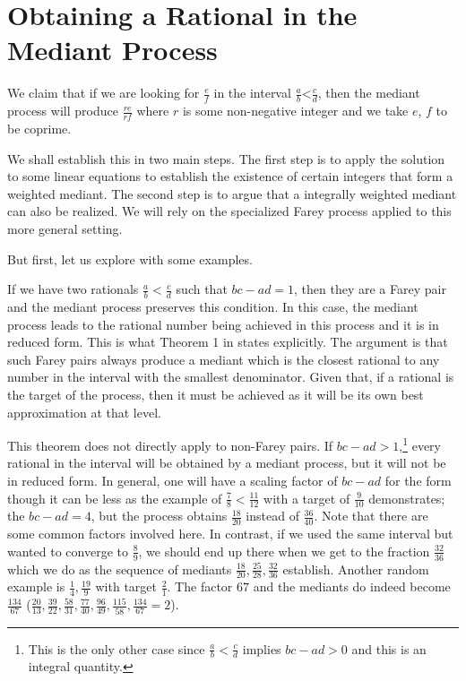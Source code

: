 \documentclass[12pt]{article}
\theoremstyle{remark}
\newcommand{\lt}{\mathord{<}}
\begin{document}
\section{Obtaining a Rational in the Mediant Process}\label{app:med}

We claim that if we are looking for $\frac{e}{f}$ in the interval $\frac{a}{b} \lt \frac{c}{d}$, then the mediant process will produce $\frac{re}{rf}$ where $r$ is some non-negative integer and we take $e$, $f$ to be coprime. 

We shall establish this in two main steps. The first step is to apply the solution to some linear equations to establish the existence of certain integers that form a weighted mediant. The second step is to argue that a integrally weighted mediant can also be realized.  We will rely on the specialized Farey process applied to this more general setting. 

But first, let us explore with some examples. 

If we have two rationals $\frac{a}{b} < \frac{c}{d}$ such that $bc - ad = 1$, then they are a Farey pair and the mediant process preserves this condition. In this case, the mediant process leads to the rational number being achieved in this process and it is in reduced form. This is what Theorem 1 in \cite{richards} states explicitly. The argument is that such Farey pairs always produce a mediant which is the closest rational to any number in the interval with the smallest denominator. Given that, if a rational is the target of the process, then it must be achieved as it will be its own best approximation at that level. 

This theorem does not directly apply to non-Farey pairs. If $bc-ad > 1$,\footnote{This is the only other case since $\frac{a}{b} < \frac{c}{d}$ implies $bc - ad > 0$ and this is an integral quantity.} every rational in the interval will be obtained by a mediant process, but it will not be in reduced form. In general, one will have a scaling factor of $bc-ad$ for the form though it can be less as the example of $\frac{7}{8}< \frac{11}{12}$ with a target of $\frac{9}{10}$ demonstrates; the $bc-ad = 4$, but the process obtains $\frac{18}{20}$ instead of $\frac{36}{40}$. Note that there are some common factors involved here. In contrast, if we used the same interval but wanted to converge to $\frac{8}{9}$, we should end up there when we get to the fraction $\frac{32}{36}$ which we do as the sequence of mediants $\frac{18}{20}, \frac{25}{28}, \frac{32}{36}$ establish. Another random example is  $\frac{1}{4} , \frac{19}{9}$ with target $\frac{2}{1}$. The factor $67$ and the mediants do indeed become $\frac{134}{67}$  ($\frac{20}{13}, \frac{39}{22}, \frac{58}{31}, \frac{77}{40}, \frac{96}{49}, \frac{115}{58}, \frac{134}{67} = 2$). 
\end{document}

